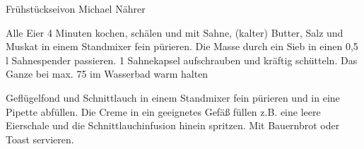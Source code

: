 \begin{recipe}{Frühstücksei}{von Michael Nährer}
  \label{Frühstücksei}
  \inglist


  \steps
  Alle Eier 4 Minuten kochen, schälen und mit Sahne, (kalter) Butter, Salz und
  Muskat in einem Standmixer fein pürieren. Die Masse durch ein Sieb in einen
  0,5 l Sahnespender passieren. 1 Sahnekapsel aufschrauben und kräftig
  schütteln. Das Ganze bei max. 75 \celsius im Wasserbad warm halten

  Geflügelfond und Schnittlauch in einem Standmixer fein pürieren und in eine
  Pipette abfüllen. Die Creme in ein geeignetes Gefäß füllen z.B. eine leere
  Eierschale und die Schnittlauchinfusion hinein spritzen. Mit Bauernbrot oder
  Toast servieren.

\end{recipe}
